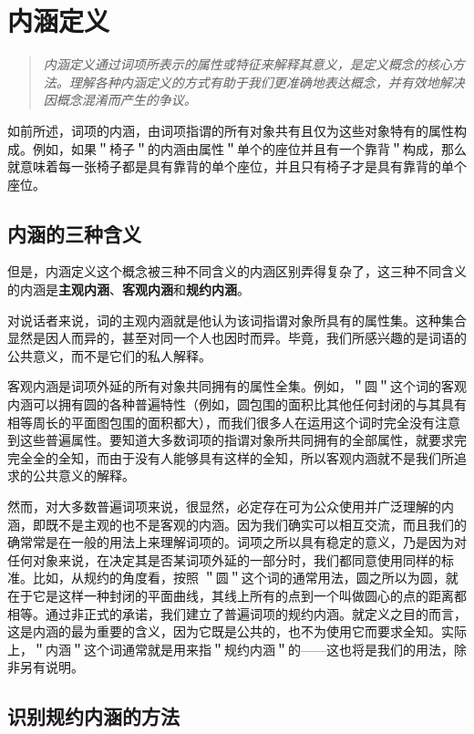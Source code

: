 \section{内涵定义}

\begin{quotation}
\textit{内涵定义通过词项所表示的属性或特征来解释其意义，是定义概念的核心方法。理解各种内涵定义的方式有助于我们更准确地表达概念，并有效地解决因概念混淆而产生的争议。}
\end{quotation}

如前所述，词项的内涵，由词项指谓的所有对象共有且仅为这些对象特有的属性构成。例如，如果＂椅子＂的内涵由属性＂单个的座位并且有一个靠背＂构成，那么就意味着每一张椅子都是具有靠背的单个座位，并且只有椅子才是具有靠背的单个座位。

\subsection{内涵的三种含义}

但是，内涵定义这个概念被三种不同含义的内涵区别弄得复杂了，这三种不同含义的内涵是\textbf{主观内涵}、\textbf{客观内涵}和\textbf{规约内涵}。

对说话者来说，词的主观内涵就是他认为该词指谓对象所具有的属性集。这种集合显然是因人而异的，甚至对同一个人也因时而异。毕竟，我们所感兴趣的是词语的公共意义，而不是它们的私人解释。

客观内涵是词项外延的所有对象共同拥有的属性全集。例如，＂圆＂这个词的客观内涵可以拥有圆的各种普遍特性（例如，圆包围的面积比其他任何封闭的与其具有相等周长的平面图包围的面积都大），而我们很多人在运用这个词时完全没有注意到这些普遍属性。要知道大多数词项的指谓对象所共同拥有的全部属性，就要求完完全全的全知，而由于没有人能够具有这样的全知，所以客观内涵就不是我们所追求的公共意义的解释。

然而，对大多数普遍词项来说，很显然，必定存在可为公众使用并广泛理解的内涵，即既不是主观的也不是客观的内涵。因为我们确实可以相互交流，而且我们的确常常是在一般的用法上来理解词项的。词项之所以具有稳定的意义，乃是因为对任何对象来说，在决定其是否某词项外延的一部分时，我们都同意使用同样的标准。比如，从规约的角度看，按照 ＂圆＂这个词的通常用法，圆之所以为圆，就在于它是这样一种封闭的平面曲线，其线上所有的点到一个叫做圆心的点的距离都相等。通过非正式的承诺，我们建立了普遍词项的规约内涵。就定义之目的而言，这是内涵的最为重要的含义，因为它既是公共的，也不为使用它而要求全知。实际上，＂内涵＂这个词通常就是用来指＂规约内涵＂的——这也将是我们的用法，除非另有说明。

\subsection{识别规约内涵的方法}

